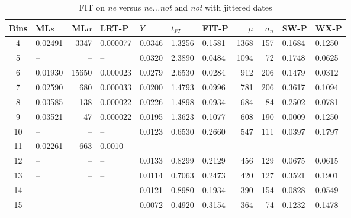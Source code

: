 
%
%


\begin{table}[ht]
\centering
\begin{tabular}{c  l  r  l  l  l  l   r  r  l  l }
  \hline
Bins & ML$s$ & ML$\alpha$ & LRT-P & $\overline{Y}$ & $t_{FI}$ & FIT-P & $\mu$ & $\sigma_n$ & SW-P  & WX-P\\ 
  \hline
  4 & 0.02491 & 3347 & 0.000077 & 0.0346 & 1.3256 & 0.1581 & 1368 & 157 & 0.1684 & 0.1250 \\ 
  5 & -- & -- & -- & 0.0320 & 2.3890 & 0.0484 & 1094 & 72 & 0.1748 & 0.0625 \\
  6 & 0.01930 & 15650 & 0.000023 & 0.0279 & 2.6530 & 0.0284 & 912 & 206 & 0.1479 & 0.0312 \\ 
  7 & 0.02590 & 680 & 0.000033 & 0.0200 & 1.4793 & 0.0996 & 781 & 206 & 0.3617 & 0.1094 \\  
  8 & 0.03585 & 138 & 0.000022 & 0.0226 & 1.4898 & 0.0934 & 684 & 84 & 0.2502 & 0.0781 \\ 
  9 & 0.03521 & 47 & 0.000022 & 0.0195 & 1.3623 & 0.1077 & 608 & 190 & 0.0009 & 0.1250 \\ 
  10 & -- & -- & -- & 0.0123 & 0.6530 & 0.2660 & 547 & 111 & 0.0397 & 0.1797 \\  
  11 & 0.02261 & 663 & 0.0010 & -- & -- & -- & -- & -- & --\\ 
  12 & -- & -- & --  &  0.0133 & 0.8299 & 0.2129 & 456 & 129 &  0.0675 & 0.0615\\
  13 & -- & -- & --  &  0.0114 & 0.7063 & 0.2473 & 420 & 127 &  0.3521 & 0.1901\\
  14 & -- & -- & --  &  0.0121 & 0.8980 & 0.1934 & 390 & 154 &  0.0828 & 0.0549\\
  15 & -- & -- & --  &  0.0072 & 0.4920 & 0.3154 & 364 & 74   &  0.1232 & 0.1478\\
   \hline
\end{tabular}
\caption{FIT on \textit{\color{red}  ne} versus \textit{\color{blue} ne...not} and \textit{\color{green} not} with jittered dates}
\label{jitter-lump-table1}
\end{table}


